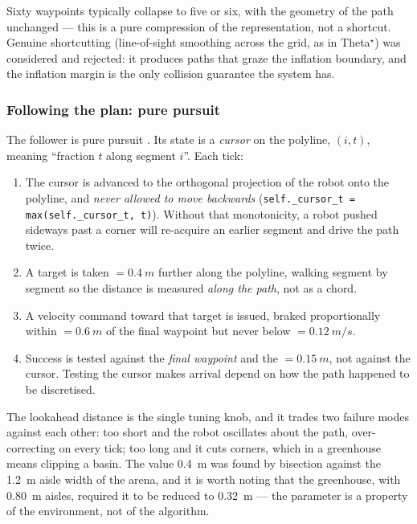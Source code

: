 Sixty waypoints typically collapse to five or six, with the geometry of
the path unchanged --- this is a pure compression of the representation,
not a shortcut. Genuine shortcutting (line-of-sight smoothing across the
grid, as in Theta$^\star$) was considered and rejected: it produces
paths that graze the inflation boundary, and the inflation margin is the
only collision guarantee the system has.



\subsubsection{Following the plan: pure pursuit}

The follower is pure pursuit \cite{coulter1992purepursuit,
snider2009steering}. Its state is a \emph{cursor} on the polyline,
$(i, t)$, meaning ``fraction $t$ along segment $i$''. Each tick:

\begin{enumerate}[leftmargin=*,itemsep=1pt,topsep=2pt]
  \item The cursor is advanced to the orthogonal projection of the robot
        onto the polyline, and \emph{never allowed to move backwards}
        (\texttt{self.\_cursor\_t = max(self.\_cursor\_t, t)}). Without
        that monotonicity, a robot pushed sideways past a corner will
        re-acquire an earlier segment and drive the path twice.
  \item A target is taken  $= \SI{0.4}{m}$
        further along the polyline, walking segment by segment so the
        distance is measured \emph{along the path}, not as a chord.
  \item A velocity command toward that target is issued, braked
        proportionally within  $= \SI{0.6}{m}$ of
        the final waypoint but never below  $=
        \SI{0.12}{m/s}$.
  \item Success is tested against the \emph{final waypoint} and the
         $= \SI{0.15}{m}$, not against the
        cursor. Testing the cursor makes arrival depend on how the path
        happened to be discretised.
\end{enumerate}

The lookahead distance is the single tuning knob, and it trades two
failure modes against each other: too short and the robot oscillates
about the path, over-correcting on every tick; too long and it cuts
corners, which in a greenhouse means clipping a basin. The value
\SI{0.4}{m} was found by bisection against the \SI{1.2}{m} aisle width
of the \phaseA{} arena, and it is worth noting that the \phaseB{}
greenhouse, with \SI{0.80}{m} aisles, required it to be reduced to
\SI{0.32}{m} --- the parameter is a property of the environment, not of
the algorithm.

